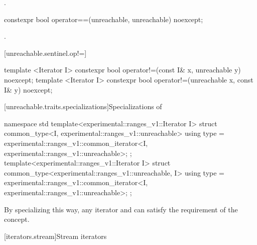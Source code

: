 \begin{addedblock}
\begin{itemdescr}
\pnum
\returns {}.
\end{itemdescr}

{\color{oldclr}
\begin{itemdecl}
constexpr bool operator==(unreachable, unreachable) noexcept;
\end{itemdecl}

\begin{itemdescr}
\pnum
\returns {}.
\end{itemdescr}
} %

[unreachable.sentinel.op!=]{}

%
%
\begin{itemdecl}
template <Iterator I>
  constexpr bool operator!=(const I& x, unreachable y) noexcept;
template <Iterator I>
  constexpr bool operator!=(unreachable x, const I& y) noexcept;
\end{itemdecl}

\begin{itemdescr}
\pnum
\returns
{}
\end{itemdescr}

{\color{oldclr}
[unreachable.traits.specializations]{Specializations of }

%
\begin{itemdecl}
namespace std {
  template<experimental::ranges_v1::Iterator I>
  struct common_type<I, experimental::ranges_v1::unreachable> {
    using type = experimental::ranges_v1::common_iterator<I, experimental::ranges_v1::unreachable>;
  };
  template<experimental::ranges_v1::Iterator I>
  struct common_type<experimental::ranges_v1::unreachable, I> {
    using type = experimental::ranges_v1::common_iterator<I, experimental::ranges_v1::unreachable>;
  };
}
\end{itemdecl}

\begin{itemdescr}
\pnum
\enternote By specializing  this way, any iterator and
 can satisfy the  requirement of the
 concept.\exitnote
\end{itemdescr}
} %
\end{addedblock}

[iterators.stream]{Stream iterators}

